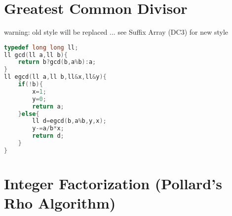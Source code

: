 \documentclass{book}
\begin{document}
\section{Greatest Common Divisor}
warning: old style will be replaced ... see Suffix Array (DC3) for new style\begin{lstlisting}[language=C++,title={Greatest Common Divisor.hpp (254 bytes, 15 lines)}]
typedef long long ll;
ll gcd(ll a,ll b){
    return b?gcd(b,a%b):a;
}
ll egcd(ll a,ll b,ll&x,ll&y){
    if(!b){
        x=1;
        y=0;
        return a;
    }else{
        ll d=egcd(b,a%b,y,x);
        y-=a/b*x;
        return d;
    }
}\end{lstlisting}
\section{Integer Factorization (Pollard's Rho Algorithm)}
\end{document}
